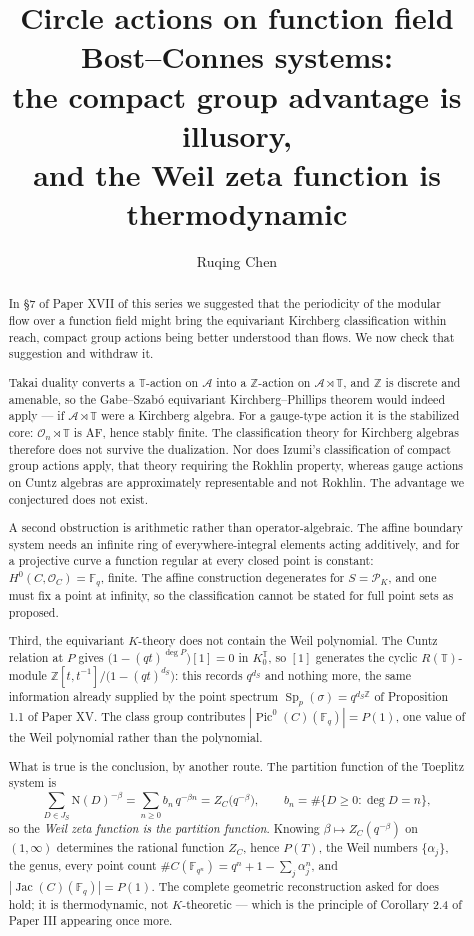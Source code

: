 \documentclass[11pt]{amsart}
\title[The compact group advantage is illusory]{Circle actions on function field Bost--Connes systems:\\ the compact group advantage is illusory,\\ and the Weil zeta function is thermodynamic}
\author{Ruqing Chen}
\date{}
\numberwithin{equation}{section}
\theoremstyle{definition}
\theoremstyle{remark}
\newcommand{\Z}{\mathbb{Z}}
\newcommand{\F}{\mathbb{F}}
\newcommand{\T}{\mathbb{T}}
\newcommand{\cA}{\mathcal{A}}
\newcommand{\cO}{\mathcal{O}}
\newcommand{\cP}{\mathcal{P}}
\newcommand{\Ns}{\mathrm{N}}
\newcommand{\Pic}{\operatorname{Pic}}
\newcommand{\Jac}{\operatorname{Jac}}
\newcommand{\Sp}{\operatorname{Sp}}
\begin{document}
\begin{abstract}
In \S7 of Paper XVII of this series we suggested that the periodicity of the modular flow over a function
field might bring the equivariant Kirchberg classification within reach, compact group actions
being better understood than flows. We now check that suggestion and withdraw it.

Takai duality converts a $\T$-action on $\cA$ into a $\Z$-action on $\cA\rtimes\T$, and $\Z$
is discrete and amenable, so the Gabe--Szab\'o equivariant Kirchberg--Phillips theorem would
indeed apply --- if $\cA\rtimes\T$ were a Kirchberg algebra. For a gauge-type action it is
the stabilized core: $\cO_n\rtimes\T$ is AF, hence stably finite. The classification theory
for Kirchberg algebras therefore does not survive the dualization. Nor does Izumi's
classification of compact group actions apply, that theory requiring the Rokhlin property,
whereas gauge actions on Cuntz algebras are approximately representable and not Rokhlin. The
advantage we conjectured does not exist.

A second obstruction is arithmetic rather than operator-algebraic. The affine boundary system
needs an infinite ring of everywhere-integral elements acting additively, and for a
projective curve a function regular at every closed point is constant:
$H^0(C,\cO_C)=\F_q$, finite. The affine construction
degenerates for $S=\cP_K$, and one must fix a point at infinity, so the classification cannot
be stated for full point sets as proposed.

Third, the equivariant $K$-theory does not contain the Weil polynomial. The Cuntz relation at
$P$ gives $\bigl(1-(qt)^{\deg P}\bigr)[1]=0$ in $K_0^\T$, so $[1]$ generates the cyclic
$R(\T)$-module $\Z[t,t^{-1}]/\bigl(1-(qt)^{d_S}\bigr)$: this records $q^{d_S}$ and nothing
more, the same information already supplied by the point spectrum
$\Sp_p(\sigma)=q^{d_S\Z}$ of Proposition 1.1 of Paper XV. The class group contributes
$|\Pic^0(C)(\F_q)|=P(1)$, one value of
the Weil polynomial rather than the polynomial.

What is true is the conclusion, by another route. The partition function of the Toeplitz
system is
\[
\sum_{D\in J_S}\Ns(D)^{-\beta}=\sum_{n\ge0}b_n\,q^{-\beta n}=Z_C\bigl(q^{-\beta}\bigr),
\qquad b_n=\#\{D\ge0:\deg D=n\},
\]
so the \emph{Weil zeta function is the partition function}. Knowing $\beta\mapsto Z_C(q^{-\beta})$
on $(1,\infty)$ determines the rational function $Z_C$, hence $P(T)$, the Weil numbers
$\{\alpha_j\}$, the genus, every point count $\#C(\F_{q^n})=q^n+1-\sum_j\alpha_j^n$, and
$|\Jac(C)(\F_q)|=P(1)$. The complete geometric reconstruction asked for does hold; it is
thermodynamic, not $K$-theoretic --- which is the principle of Corollary 2.4 of Paper III
appearing once more.
\end{abstract}
\end{document}
